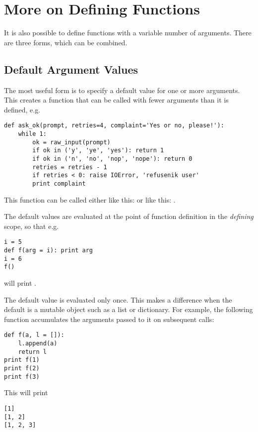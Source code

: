 \documentclass{manual}
\begin{document}
\section{More on Defining Functions \label{defining}}

It is also possible to define functions with a variable number of
arguments.  There are three forms, which can be combined.

\subsection{Default Argument Values \label{defaultArgs}}

The most useful form is to specify a default value for one or more
arguments.  This creates a function that can be called with fewer
arguments than it is defined, e.g.

\begin{verbatim}
def ask_ok(prompt, retries=4, complaint='Yes or no, please!'):
    while 1:
        ok = raw_input(prompt)
        if ok in ('y', 'ye', 'yes'): return 1
        if ok in ('n', 'no', 'nop', 'nope'): return 0
        retries = retries - 1
        if retries < 0: raise IOError, 'refusenik user'
        print complaint
\end{verbatim}

This function can be called either like this:
 or like this:
.

The default values are evaluated at the point of function definition
in the \emph{defining} scope, so that e.g.

\begin{verbatim}
i = 5
def f(arg = i): print arg
i = 6
f()
\end{verbatim}

will print .

  The default value is evaluated only once.
This makes a difference when the default is a mutable object such as a
list or dictionary.  For example, the following function accumulates
the arguments passed to it on subsequent calls:

\begin{verbatim}
def f(a, l = []):
    l.append(a)
    return l
print f(1)
print f(2)
print f(3)
\end{verbatim}

This will print

\begin{verbatim}
[1]
[1, 2]
[1, 2, 3]
\end{verbatim}
\end{document}
